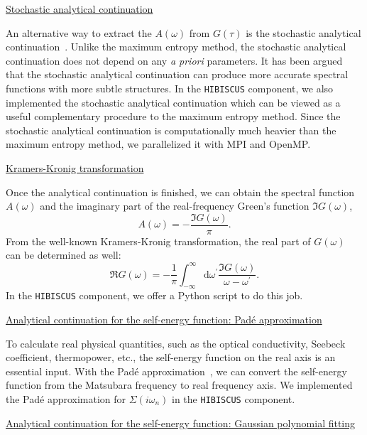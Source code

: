 \underline{Stochastic analytical continuation}

An alternative way to extract the $A(\omega)$ from $G(\tau)$ is the stochastic analytical continuation~\cite{arXiv:0403055}. Unlike the maximum entropy method, the stochastic analytical continuation does not depend on any \emph{a priori} parameters. It has been argued that the stochastic analytical continuation can produce more accurate spectral functions with more subtle structures. In the \texttt{HIBISCUS} component, we also implemented the stochastic analytical continuation which can be viewed as a useful complementary procedure to the maximum entropy method. Since the stochastic analytical continuation is computationally much heavier than the maximum entropy method, we parallelized it with MPI and OpenMP.

\underline{Kramers-Kronig transformation}

Once the analytical continuation is finished, we can obtain the spectral function $A(\omega)$ and the imaginary part of the real-frequency Green's function $\Im G(\omega)$,
\begin{equation}
A(\omega) = -\frac{\Im G(\omega)}{\pi}.
\end{equation}
From the well-known Kramers-Kronig transformation, the real part of $G(\omega)$ can be determined as well:
\begin{equation}
\Re G(\omega) = -\frac{1}{\pi} \int^{\infty}_{-\infty} \text{d}\omega^{\prime} \frac{\Im G(\omega)}{\omega - \omega^{\prime}}.
\end{equation}
In the \texttt{HIBISCUS} component, we offer a Python script to do this job.

\underline{Analytical continuation for the self-energy function: Pad\'{e} approximation}

To calculate real physical quantities, such as the optical conductivity, Seebeck coefficient, thermopower, etc., the self-energy function on the real axis is an essential input. With the Pad\'{e} approximation~\cite{pade}, we can convert the self-energy function from the Matsubara frequency to real frequency axis. We implemented the Pad\'{e} approximation for $\Sigma(i\omega_n)$ in the \texttt{HIBISCUS} component.

\underline{Analytical continuation for the self-energy function: Gaussian polynomial fitting}

